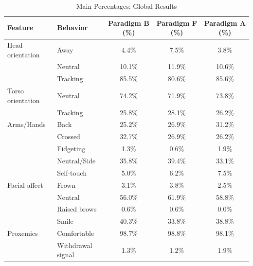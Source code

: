 \begin{table}[ht]
\centering
\caption{Main Percentages: Global Results}
\label{tab:main_pct_global}
\begin{tabular}{llccc}
\toprule
Feature & Behavior & Paradigm B (\%) & Paradigm F (\%) & Paradigm A (\%) \\
\midrule
Head orientation & Away & 4.4\% & 7.5\% & 3.8\% \\
~ & Neutral & 10.1\% & 11.9\% & 10.6\% \\
~ & Tracking & 85.5\% & 80.6\% & 85.6\% \\
\midrule
Torso orientation & Neutral & 74.2\% & 71.9\% & 73.8\% \\
~ & Tracking & 25.8\% & 28.1\% & 26.2\% \\
\midrule
Arms/Hands & Back & 25.2\% & 26.9\% & 31.2\% \\
~ & Crossed & 32.7\% & 26.9\% & 26.2\% \\
~ & Fidgeting & 1.3\% & 0.6\% & 1.9\% \\
~ & Neutral/Side & 35.8\% & 39.4\% & 33.1\% \\
~ & Self-touch & 5.0\% & 6.2\% & 7.5\% \\
\midrule
Facial affect & Frown & 3.1\% & 3.8\% & 2.5\% \\
~ & Neutral & 56.0\% & 61.9\% & 58.8\% \\
~ & Raised brows & 0.6\% & 0.6\% & 0.0\% \\
~ & Smile & 40.3\% & 33.8\% & 38.8\% \\
\midrule
Proxemics & Comfortable & 98.7\% & 98.8\% & 98.1\% \\
~ & Withdrawal signal & 1.3\% & 1.2\% & 1.9\% \\
\bottomrule
\end{tabular}
\end{table}